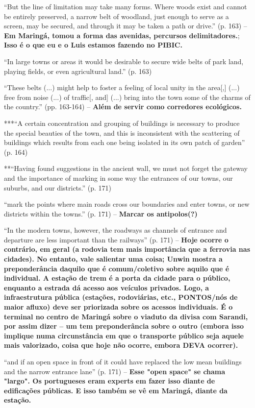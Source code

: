 \documentclass[12pt, a4paper]{book} %
\begin{document}
        ``But the line of limitation may take many forms. Where woods exist and cannot be entirely preserved, a narrow belt of woodland, just enough to serve as a screen, may be secured, and through it may be taken a path or drive.'' (p. 163) – \textbf{Em Maringá, tomou a forma das avenidas, percursos delimitadores.}; \textbf{Isso é o que eu e o Luis estamos fazendo no PIBIC.}

        ``In large towns or areas it would be desirable to secure wide belts of park land, playing fields, or even agricultural land.'' (p. 163)

        ``These belts (...) might help to foster a feeling of local unity in the area[,] (...) free from noise (...) of traffic[, and] (...) bring into the town some of the charms of the country.'' (pp. 163-164) – \textbf{Além de servir como corredores ecológicos.}

        ***``A certain concentration and grouping of buildings is necessary to produce the special beauties of the town, and this is inconsistent with the scattering of buildings which results from each one being isolated in its own patch of garden'' (p. 164)

        **``Having found suggestions in the ancient wall, we must not forget the gateway and the importance of marking in some way the entrances of our towns, our suburbs, and our districts.'' (p. 171)

        ``mark the points where main roads cross our boundaries and enter towns, or new districts within the towns.'' (p. 171) – \textbf{Marcar os antipolos(?)}

        ``In the modern towns, however, the roadways as channels of entrance and departure are less important than the railways'' (p. 171) – \textbf{Hoje ocorre o contrário, em geral (a rodovia tem mais importância que a ferrovia nas cidades). No entanto, vale salientar uma coisa; Unwin mostra a preponderância daquilo que é comum/coletivo sobre aquilo que é individual. A estação de trem é a porta da cidade para o público, enquanto a estrada dá acesso aos veículos privados. Logo, a infraestrutura pública (estações, rodoviárias, etc., PONTOS/nós de maior afluxo) deve ser priorizada sobre os acessos individuais. É o terminal no centro de Maringá sobre o viaduto da divisa com Sarandi, por assim dizer – um tem preponderância sobre o outro (embora isso implique numa circunstância em que o transporte público seja aquele mais valorizado, coisa que hoje não ocorre, embora DEVA ocorrer).}

        ``and if an open space in front of it could have replaced the low mean buildings and the narrow entrance lane'' (p. 171) – \textbf{Esse "open space" se chama "largo". Os portugueses eram experts em fazer isso diante de edificações públicas. E isso também se vê em Maringá, diante da estação.}
\end{document}

